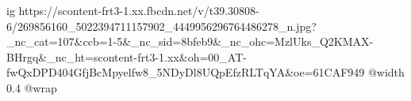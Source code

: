  
 
 
 
 

\ifcmt
  ig https://scontent-frt3-1.xx.fbcdn.net/v/t39.30808-6/269856160_5022394711157902_4449956296764486278_n.jpg?_nc_cat=107&ccb=1-5&_nc_sid=8bfeb9&_nc_ohc=MzlUks_Q2KMAX-BHrgq&_nc_ht=scontent-frt3-1.xx&oh=00_AT-fwQxDPD404GfjBcMpyelfw8_5NDyDl8UQpEfzRLTqYA&oe=61CAF949
  @width 0.4
  @wrap 
\fi
